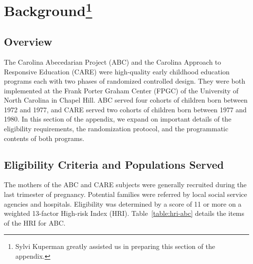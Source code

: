 \section[Background]{Background\footnote{Sylvi Kuperman greatly assisted us in preparing this section of the appendix.}} \label{appendix:background}

\subsection{Overview}

\noindent The Carolina Abecedarian Project (ABC) and the Carolina Approach to Responsive Education (CARE) were high-quality early childhood education programs each with two phases of randomized controlled design. They were both implemented at the Frank Porter Graham Center (FPGC) of the University of North Carolina in Chapel Hill. ABC served four cohorts of children born between 1972 and 1977, and CARE served two cohorts of children born between 1977 and 1980. In this section of the appendix, we expand on important details of the eligibility requirements, the randomization protocol, and the programmatic contents of both programs.

\subsection{Eligibility Criteria and Populations Served}\label{app:eligibility-pop}

\noindent The mothers of the ABC and CARE subjects were generally recruited during the last trimester  of pregnancy. Potential families were referred by local social service agencies and hospitals. Eligibility was determined by a score of 11 or more on a weighted 13-factor High-risk Index (HRI). Table~\ref{table:hri-abc} details the items of the HRI for ABC.\\

